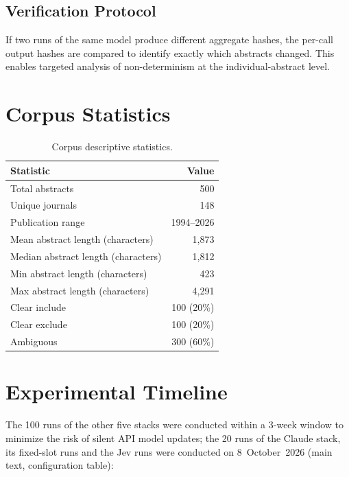\documentclass[11pt]{article}
\newenvironment{fittab}{\begin{lrbox}{\fittabbox}}{\end{lrbox}%
  \ifdim\wd\fittabbox>\linewidth\resizebox{\linewidth}{!}{\usebox{\fittabbox}}\else\usebox{\fittabbox}\fi}
\begin{document}
\subsection{Verification Protocol}

If two runs of the same model produce different aggregate hashes, the per-call output hashes are compared to identify exactly which abstracts changed.
This enables targeted analysis of non-determinism at the individual-abstract level.

\section{Corpus Statistics}
\label{sec:corpusstats}

\begin{table}[htbp]
\centering
\caption{Corpus descriptive statistics.}
\begin{fittab}\begin{tabular}{lr}
\toprule
\textbf{Statistic} & \textbf{Value} \\
\midrule
Total abstracts & 500 \\
Unique journals & 148 \\
Publication range & 1994--2026 \\
Mean abstract length (characters) & 1,873 \\
Median abstract length (characters) & 1,812 \\
Min abstract length (characters) & 423 \\
Max abstract length (characters) & 4,291 \\
\midrule
Clear include & 100 (20\%) \\
Clear exclude & 100 (20\%) \\
Ambiguous & 300 (60\%) \\
\bottomrule
\end{tabular}\end{fittab}
\end{table}

\section{Experimental Timeline}
\label{sec:timeline}

The 100 runs of the other five stacks were conducted within a 3-week window to minimize the risk of silent API model updates; the 20 runs of the Claude stack, its fixed-slot runs and the Jev runs were conducted on 8~October~2026 (main text, configuration table):
\end{document}
